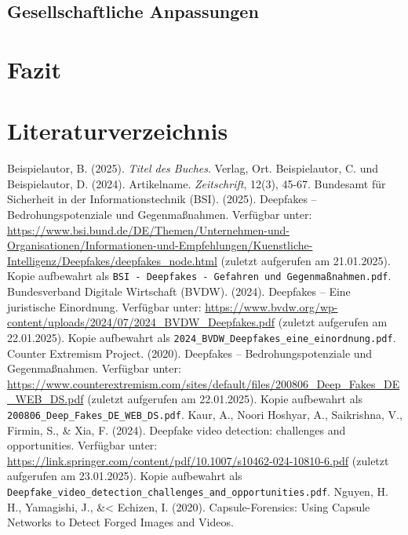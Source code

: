 \documentclass[a4paper,12pt]{article}
\begin{document}
\subsection{Gesellschaftliche Anpassungen}
\newpage

\section{Fazit}



\newpage
{}
\section*{Literaturverzeichnis}
\begin{thebibliography}{99}
     Beispielautor, B. (2025). 
    \textit{Titel des Buches}. Verlag, Ort.
     Beispielautor, C. und Beispielautor, D. (2024). Artikelname. 
    \textit{Zeitschrift}, 12(3), 45-67.
     Bundesamt f\"ur Sicherheit in der Informationstechnik (BSI). (2025). Deepfakes – Bedrohungspotenziale und Gegenmaßnahmen. 
    Verfügbar unter: \url{https://www.bsi.bund.de/DE/Themen/Unternehmen-und-Organisationen/Informationen-und-Empfehlungen/Kuenstliche-Intelligenz/Deepfakes/deepfakes_node.html} (zuletzt aufgerufen am 21.01.2025). Kopie aufbewahrt als \texttt{BSI - Deepfakes - Gefahren und Gegenmaßnahmen.pdf}.
     Bundesverband Digitale Wirtschaft (BVDW). (2024). Deepfakes – Eine juristische Einordnung. 
    Verfügbar unter: \url{https://www.bvdw.org/wp-content/uploads/2024/07/2024_BVDW_Deepfakes.pdf} (zuletzt aufgerufen am 22.01.2025). Kopie aufbewahrt als \texttt{2024\_BVDW\_Deepfakes\_eine\_einordnung.pdf}.
     Counter Extremism Project. (2020). Deepfakes – Bedrohungspotenziale und Gegenmaßnahmen.
    Verfügbar unter: \url{https://www.counterextremism.com/sites/default/files/200806_Deep_Fakes_DE_WEB_DS.pdf} (zuletzt aufgerufen am 22.01.2025). Kopie aufbewahrt als \texttt{200806\_Deep\_Fakes\_DE\_WEB\_DS.pdf}.
     Kaur, A., Noori Hoshyar, A., Saikrishna, V., Firmin, S., \& Xia, F. (2024). Deepfake video detection: challenges and opportunities. Verfügbar unter: 
    \url{https://link.springer.com/content/pdf/10.1007/s10462-024-10810-6.pdf} (zuletzt aufgerufen am 23.01.2025). Kopie aufbewahrt als \texttt{Deepfake\_video\_detection\_challenges\_and\_opportunities.pdf}.
     Nguyen, H. H., Yamagishi, J., \&< Echizen, I. (2020). Capsule-Forensics: Using Capsule Networks to Detect Forged Images and Videos. 

\end{thebibliography}
\end{document}
